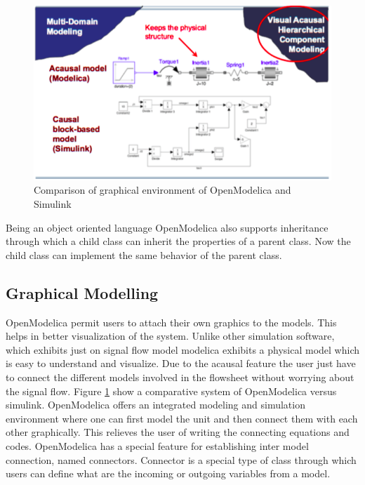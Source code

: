 \documentclass[12pt]{report}
\begin{document}
\begin{figure}[t]
\centering
\includegraphics[width=1\linewidth]{om1}
\caption{Comparison of graphical environment of OpenModelica and Simulink \cite{PeterFrit}}
\label{fig:OM1}
\end{figure}

Being an object oriented language OpenModelica also supports inheritance through which a child class can inherit the properties of a parent class. Now the child class can implement the same behavior of the parent class.

\subsection{Graphical Modelling}
OpenModelica permit users to attach their own graphics to the models. This helps in better visualization of the system. Unlike other simulation software, which exhibits just on signal flow model modelica exhibits a physical model which is easy to understand and visualize. Due to the acausal feature the user just have to connect the different models involved in the flowsheet without worrying about the signal flow. Figure \ref{fig:OM1} show a comparative system of OpenModelica versus simulink.
OpenModelica offers an integrated modeling and simulation environment where one can first model the unit and then connect them with each other graphically. This relieves the user of writing the connecting equations and codes. OpenModelica has a special feature for establishing inter model connection, named connectors. Connector is a special type of class through which users can define what are the incoming or outgoing variables from a model.
\end{document}
